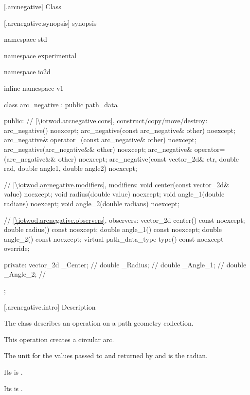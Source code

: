  [\iotwod.arcnegative] {Class }

 [\iotwod.arcnegative.synopsis] { synopsis}

\begin{codeblock}
namespace std { namespace experimental { namespace io2d { inline namespace v1 {
  class arc_negative : public path_data {
  public:
    // \ref{\iotwod.arcnegative.cons}, construct/copy/move/destroy:
    arc_negative() noexcept;
    arc_negative(const arc_negative& other) noexcept;
    arc_negative& operator=(const arc_negative& other) noexcept;
    arc_negative(arc_negative&& other) noexcept;
    arc_negative& operator=(arc_negative&& other) noexcept;
    arc_negative(const vector_2d& ctr, double rad, double angle1,
      double angle2) noexcept;

    // \ref{\iotwod.arcnegative.modifiers}, modifiers:
    void center(const vector_2d& value) noexcept;
    void radius(double value) noexcept;
    void angle_1(double radians) noexcept;
    void angle_2(double radians) noexcept;

    // \ref{\iotwod.arcnegative.observers}, observers:
    vector_2d center() const noexcept;
    double radius() const noexcept;
    double angle_1() const noexcept;
    double angle_2() const noexcept;
    virtual path_data_type type() const noexcept override;

  private:
    vector_2d _Center;   // \expos
    double _Radius;  // \expos
    double _Angle_1; // \expos
    double _Angle_2; // \expos
  };
} } } }
\end{codeblock}

 [\iotwod.arcnegative.intro] { Description}

\pnum
{}
The class  describes an operation on a path geometry collection.

\pnum
This operation creates a circular arc.

\pnum
The unit for the values passed to and returned by  and  is the radian.

\pnum
Its  is .

\pnum
Its  is .

